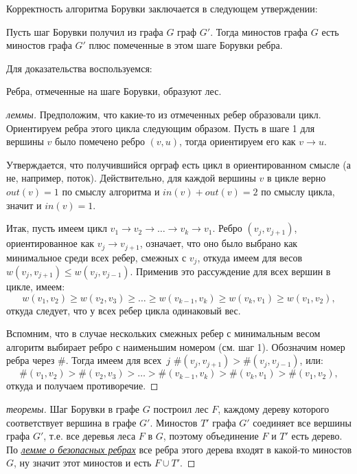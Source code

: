 Корректность алгоритма Борувки заключается в следующем утверждении:

\begin{theorem*} Пусть шаг Борувки получил из графа $G$ граф $G'$. Тогда миностов графа $G$ есть миностов графа $G'$ плюс помеченные в этом шаге Борувки ребра. \end{theorem*}
Для доказательства воспользуемся:
\begin{lemma*} Ребра, отмеченные на шаге Борувки, образуют лес. \end{lemma*}
\begin{proof}[\achtung леммы]

Предположим, что какие-то из отмеченных ребер образовали цикл. Ориентируем ребра этого цикла следующим образом. Пусть в шаге 1 для вершины $v$ было помечено ребро $(v, u)$, тогда ориентируем его как $v\rightarrow u$. 

Утверждается, что получившийся орграф есть цикл в ориентированном смысле (а не, например, поток). Действительно, для каждой вершины $v$ в цикле верно $out(v) = 1$ по смыслу алгоритма и $in(v) + out(v) = 2$ по смыслу цикла, значит и $in(v) = 1$. 

Итак, пусть имеем цикл $v_1 \rightarrow v_2 \rightarrow \ldots \rightarrow v_k \rightarrow v_1$. Ребро $(v_j, v_{j+1})$, ориентированное как $v_j \rightarrow v_{j+1}$, означает, что оно было выбрано как минимальное среди всех ребер, смежных с $v_j$, откуда имеем для весов $w(v_j, v_{j+1}) \leq w(v_j, v_{j-1})$. Применив это рассуждение для всех вершин в цикле, имеем: $$w(v_1, v_2) \geq w(v_2, v_3) \geq \ldots \geq w(v_{k-1}, v_k) \geq w(v_k, v_1) \geq w(v_1, v_2),$$
откуда следует, что у всех ребер цикла одинаковый вес.

Вспомним, что в случае нескольких смежных ребер с минимальным весом алгоритм выбирает ребро с наименьшим номером (см. шаг 1). Обозначим номер ребра через $\#$. Тогда имеем для всех~$j$ $\#(v_j, v_{j+1}) > \#(v_j, v_{j-1})$, или:
$$\#(v_1, v_2) > \#(v_2, v_3) > \ldots > \#(v_{k-1}, v_k) > \#(v_k, v_1) > \#(v_1, v_2),$$
откуда и получаем противоречие.
\end{proof}

\begin{proof}[\achtung теоремы]
Шаг Борувки в графе $G$ построил лес $F$, каждому дереву которого соответствует вершина в графе $G'$. Миностов $T'$ графа $G'$ соединяет все вершины графа $G'$, т.е. все деревья леса $F$ в $G$, поэтому объединение $F$ и $T'$ есть дерево. По \hyperlink{baselemma}{\textit{лемме о безопасных ребрах}} все ребра этого дерева входят в какой-то миностов $G$, ну значит этот миностов и есть $F \cup T'$. 
\end{proof}

